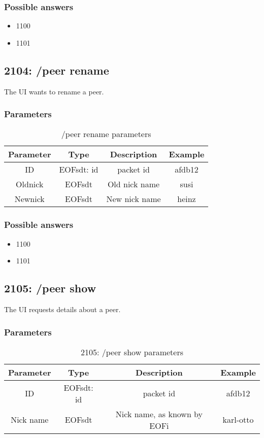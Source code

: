 \documentclass[12pt,a4paper]{book}
\begin{document}
\subsubsection{Possible answers}
\begin{itemize}
\item 1100
\item 1101
\end{itemize}
\subsection{2104: /peer rename}
The UI wants to rename a peer.

\subsubsection{Parameters}
%
\begin{longtable}{|c|c|c|c|}
\caption{/peer rename parameters}\\
\hline
\textbf{Parameter} & \textbf{Type} & \textbf{Description} & \textbf{Example}\\
\hline
ID & EOFsdt: id & packet id & afdb12\\
\hline
Oldnick & EOFsdt & Old nick name & susi\\
\hline
Newnick & EOFsdt & New nick name & heinz\\
\hline
\end{longtable}

\subsubsection{Possible answers}
\begin{itemize}
\item 1100
\item 1101
\end{itemize}

\subsection{2105: /peer show}
The UI requests details about a peer.

\subsubsection{Parameters}
\begin{longtable}{|c|c|c|c|}
\caption{2105: /peer show parameters}\\
\hline
\textbf{Parameter} & \textbf{Type} & \textbf{Description} & \textbf{Example}\\
\hline
ID & EOFsdt: id & packet id & afdb12\\
\hline
Nick name & EOFsdt & Nick name, as known by EOFi & karl-otto\\
\hline
\end{longtable}
\end{document}
